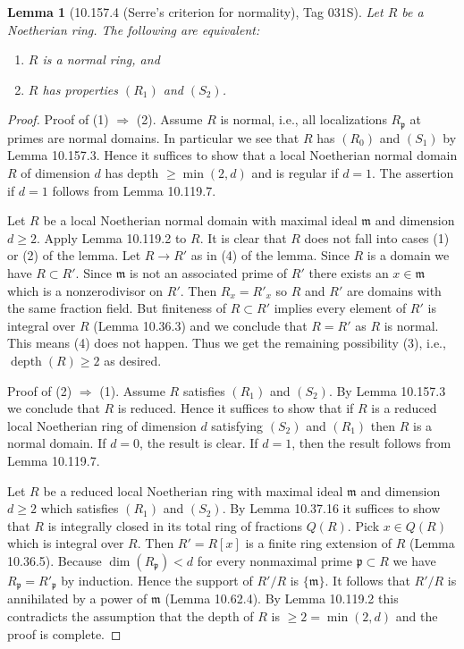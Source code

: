 \documentclass[UTF8,11pt]{ctexart}
\newtheorem*{lemma}{Lemma}
\begin{document}
\begin{lemma}[10.157.4 (Serre's criterion for normality), Tag 031S]
Let $R$ be a Noetherian ring. The following are equivalent:
\begin{enumerate}
\item $R$ is a normal ring, and
\item $R$ has properties $(R_1)$ and $(S_2)$.
\end{enumerate}
\end{lemma}
\begin{proof}
Proof of (1) $\Rightarrow$ (2). Assume $R$ is normal, i.e., all localizations $R_{\mathfrak p}$ at primes are normal domains. In particular we see that $R$ has $(R_0)$ and $(S_1)$ by Lemma 10.157.3. Hence it suffices to show that a local Noetherian normal domain $R$ of dimension $d$ has depth $\geq\min(2,d)$ and is regular if $d=1$. The assertion if $d=1$ follows from Lemma 10.119.7.

Let $R$ be a local Noetherian normal domain with maximal ideal $\mathfrak m$ and dimension $d\geq2$. Apply Lemma 10.119.2 to $R$. It is clear that $R$ does not fall into cases (1) or (2) of the lemma. Let $R\to R'$ as in (4) of the lemma. Since $R$ is a domain we have $R\subset R'$. Since $\mathfrak m$ is not an associated prime of $R'$ there exists an $x\in\mathfrak m$ which is a nonzerodivisor on $R'$. Then $R_x=R'_x$ so $R$ and $R'$ are domains with the same fraction field. But finiteness of $R\subset R'$ implies every element of $R'$ is integral over $R$ (Lemma 10.36.3) and we conclude that $R=R'$ as $R$ is normal. This means (4) does not happen. Thus we get the remaining possibility (3), i.e., $\operatorname{depth}(R)\geq2$ as desired.

Proof of (2) $\Rightarrow$ (1). Assume $R$ satisfies $(R_1)$ and $(S_2)$. By Lemma 10.157.3 we conclude that $R$ is reduced. Hence it suffices to show that if $R$ is a reduced local Noetherian ring of dimension $d$ satisfying $(S_2)$ and $(R_1)$ then $R$ is a normal domain. If $d=0$, the result is clear. If $d=1$, then the result follows from Lemma 10.119.7.

Let $R$ be a reduced local Noetherian ring with maximal ideal $\mathfrak m$ and dimension $d\geq2$ which satisfies $(R_1)$ and $(S_2)$. By Lemma 10.37.16 it suffices to show that $R$ is integrally closed in its total ring of fractions $Q(R)$. Pick $x\in Q(R)$ which is integral over $R$. Then $R'=R[x]$ is a finite ring extension of $R$ (Lemma 10.36.5). Because $\dim(R_{\mathfrak p})<d$ for every nonmaximal prime $\mathfrak p\subset R$ we have $R_{\mathfrak p}=R'_{\mathfrak p}$ by induction. Hence the support of $R'/R$ is $\{\mathfrak m\}$. It follows that $R'/R$ is annihilated by a power of $\mathfrak m$ (Lemma 10.62.4). By Lemma 10.119.2 this contradicts the assumption that the depth of $R$ is $\geq2=\min(2,d)$ and the proof is complete.
\end{proof}
\end{document}
